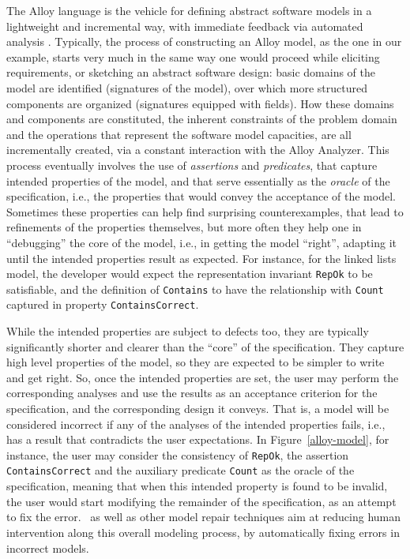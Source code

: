 The Alloy language is the vehicle for defining abstract software models in a lightweight and incremental way, with immediate feedback via automated analysis \cite{Jackson2006}. Typically, the process of constructing an Alloy model, as the one in our example, starts very much in the same way one would proceed while eliciting requirements, or sketching an abstract software design: basic domains of the model are identified (signatures of the model), over which more structured components are organized (signatures equipped with fields). How these domains and components are constituted, the inherent constraints of the problem domain and the operations that represent the software model capacities, are all incrementally created, via a constant interaction with the Alloy Analyzer. This process eventually involves the use of \emph{assertions} and \emph{predicates}, that capture intended properties of the model, and that serve essentially as the \emph{oracle} of the specification, i.e., the properties that would convey the acceptance of the model. Sometimes these properties can help find surprising counterexamples, that lead to refinements of the properties themselves, but more often they help one in ``debugging'' the core of the model, i.e., in getting the model ``right'', adapting it until the intended properties result as expected. For instance, for the linked lists model, the developer would expect the representation invariant \texttt{RepOk} to be satisfiable, and the definition of \texttt{Contains} to have the relationship with \texttt{Count} captured in property \texttt{ContainsCorrect}.  

While the intended properties are subject to defects too, they are typically significantly shorter and clearer than the ``core'' of the specification. They capture high level properties of the model, so they are expected to be simpler to write and get right. So, once the intended properties are set, the user may perform the corresponding analyses and use the results as an acceptance criterion for the specification, and the corresponding design it conveys. That is, a model will be considered incorrect if any of the analyses of the intended properties fails, i.e., has a result that contradicts the user expectations. In Figure~\ref{alloy-model}, for instance, the user may consider the consistency of \texttt{RepOk}, the assertion \texttt{ContainsCorrect} and the auxiliary predicate \texttt{Count} as the oracle of the specification, meaning that when this intended property is found to be invalid, the user would start modifying the remainder of the specification, as an attempt to fix the error. \technique\ as well as other model repair techniques aim at reducing human intervention along this overall modeling process, by automatically fixing errors in incorrect models.


